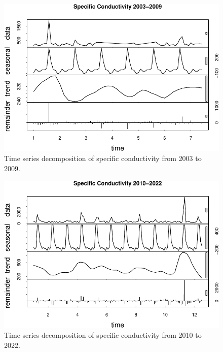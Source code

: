 \documentclass[
  12pt,
]{article}
\begin{document}
\begin{figure}

{\centering \includegraphics{Project_Template_files/figure-latex/Plot of Early Specific Conductivity Time Series Decomposition-1} 

}

\caption{Time series decomposition of specific conductivity from 2003 to 2009.}\label{fig:Plot of Early Specific Conductivity Time Series Decomposition}
\end{figure}

\begin{figure}

{\centering \includegraphics{Project_Template_files/figure-latex/Plot of Late Specific Conductivity Time Series Decomposition-1} 

}

\caption{Time series decomposition of specific conductivity from 2010 to 2022.}\label{fig:Plot of Late Specific Conductivity Time Series Decomposition}
\end{figure}
\end{document}
